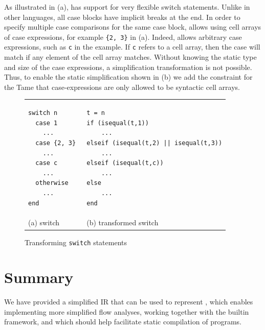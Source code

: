 As illustrated in (a), \matlab has support for very flexible
switch statements. Unlike in other languages, all case blocks have implicit
breaks at the end. In order to specify multiple case comparisons for the same
case block, \matlab allows using cell arrays of case expressions, for example
\texttt{\{2, 3\}} in (a).   Indeed, \matlab allows arbitrary case
expressions,  such as \lstinline{c} in the example.  If \lstinline{c} refers to
a cell array,  then the case will match if any element of the cell array
matches.  Without knowing the static type and size of the case expressions, a
simplification transformation is not possible.  Thus, to enable the static
simplification shown in (b) we add the constraint for the
Tame \matlab that case-expressions are only allowed to be syntactic cell
arrays.

\begin{figure}[htbp]
\begin{center}
\begin{tabular}{p{2in} p{3in}}
\begin{lstlisting}
switch n
  case 1
    ...
  case {2, 3} 
    ...
  case c 
    ...
  otherwise
    ...
end
\end{lstlisting}
&
\begin{lstlisting}
t = n
if (isequal(t,1))
    ...
elseif (isequal(t,2) || isequal(t,3))
    ...
elseif (isequal(t,c))
    ...
else
    ...
end
\end{lstlisting}
\\
(a) switch & (b) transformed switch
\end{tabular}

\caption{Transforming \texttt{switch} statements} \label{Fig:Switch}
\end{center}
\end{figure}



\section{Summary}

We have provided a simplified IR that can be used to represent \matlab,
which enables implementing more simplified flow analyses, working
together with the builtin framework, and which should help facilitate
static compilation of \matlab programs.


